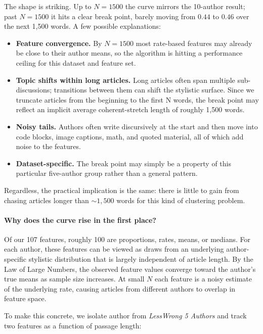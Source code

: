 \documentclass[11pt]{article}
\newcommand{\code}[1]{%
  \tcbox[on line, colback=codebg, colframe=codebg,
         boxrule=0pt, arc=2pt, left=2pt, right=2pt, top=0pt, bottom=0pt]
        {\ttfamily\small #1}}
\begin{document}
The shape is striking. Up to $N=1500$ the curve mirrors the 10-author result;
past $N=1500$ it hits a clear break point, barely moving from $0.44$ to
$0.46$ over the next 1{,}500 words. A few possible explanations:

\begin{itemize}\setlength\itemsep{2pt}
  \item \textbf{Feature convergence.} By $N=1500$ most rate-based features may
        already be close to their author means, so the algorithm is hitting a
        performance ceiling for this dataset and feature set.
  \item \textbf{Topic shifts within long articles.} Long articles often span
        multiple sub-discussions; transitions between them can shift the
        stylistic surface. Since we truncate articles from the beginning to the first N words, the break point may reflect an implicit average
        coherent-stretch length of roughly 1{,}500 words.
  \item \textbf{Noisy tails.} Authors often write discursively at the start
        and then move into code blocks, image captions, math, and quoted
        material, all of which add noise to the features.
  \item \textbf{Dataset-specific.} The break point may simply be a property
        of this particular five-author group rather than a general pattern.
\end{itemize}

Regardless, the practical implication is the same: there is little to gain
from chasing articles longer than $\sim 1{,}500$ words for this kind of
clustering problem.

\paragraph{Why does the curve rise in the first place?}
Of our 107 features, roughly 100 are proportions, rates, means, or medians. For each author, these features can be viewed as draws from an underlying author-specific stylistic distribution that is largely independent of article length.
By the Law of Large Numbers, the observed feature values converge toward the author’s true means as sample size increases. At small $N$
each feature is a noisy estimate of the underlying rate, causing articles from
different authors to overlap in feature space.

To make this concrete, we isolate author \code{zvi} from \textit{LessWrong 5 Authors}
and track two features as a function of passage length:
\end{document}
